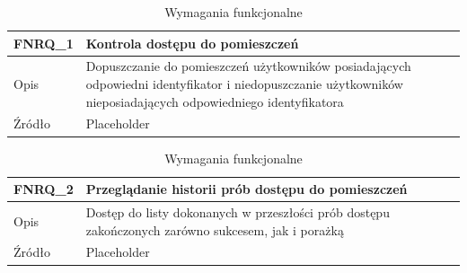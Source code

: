         \begin{table}[h!]
            \caption{Wymagania funkcjonalne}
            \centering
            \begin{subtable}[c]{\textwidth}
                \centering
                \begin{tabular}{|p{2cm}|p{12cm}|}
                    \hline FNRQ\_1      & \textbf{Kontrola dostępu do pomieszczeń}  \\
                    \hline \cellcolor[gray]{0.8} Opis         & Dopuszczanie do pomieszczeń użytkowników posiadających odpowiedni identyfikator i niedopuszczanie użytkowników nieposiadających odpowiedniego identyfikatora  \\
                    \hline \cellcolor[gray]{0.8} Źródło       & Placeholder    \\
                    \hline
                \end{tabular}
                \label{tbl:fnrq1}
                \vspace{10mm}           
            \end{subtable}
        \quad%
            \begin{subtable}[c]{\textwidth}
                \centering
                 \begin{tabular}{|p{2cm}|p{12cm}|}
                    \hline FNRQ\_2      & \textbf{Przeglądanie historii prób dostępu do pomieszczeń}  \\
                    \hline \cellcolor[gray]{0.8} Opis         & Dostęp do listy dokonanych w przeszłości prób dostępu zakończonych zarówno sukcesem, jak i porażką \\
                    \hline \cellcolor[gray]{0.8} Źródło       & Placeholder    \\
                    \hline
                \end{tabular}
                \label{tbl:fnrq2}
                \vspace{10mm}           
            \end{subtable}
        \label{tbl:fnrq}
        \end{table}
    
        \pagebreak  

